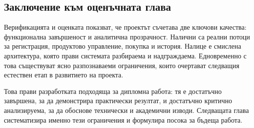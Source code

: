 \subsection{Заключение към оценъчната глава}

Верификацията и оценката показват, че проектът съчетава две ключови качества: функционална завършеност и аналитична прозрачност. Налични са реални потоци за регистрация, продуктово управление, покупка и история. Налице е смислена архитектура, която прави системата разбираема и надграждаема. Едновременно с това съществуват ясно разпознаваеми ограничения, които очертават следващия естествен етап в развитието на проекта.

Това прави разработката подходяща за дипломна работа: тя е достатъчно завършена, за да демонстрира практически резултат, и достатъчно критично анализируема, за да обоснове технически и академични изводи. Следващата глава систематизира именно тези ограничения и формулира посока за бъдеща работа.
